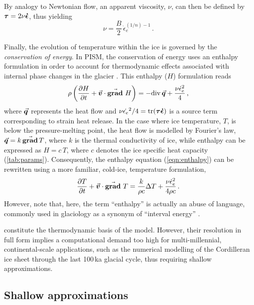\documentclass[a4paper]{kappa}
\newcommand{\vect}[1]{\va*{#1}} %
\newcommand{\tens}[1]{\vb*{#1}} %
\renewcommand{\div}[1]{\mathrm{div}\,#1}            %
\renewcommand{\grad}[1]{\vect{\mathrm{grad}}\,#1}   %
\newcommand{\matdv}[1]{\pdv{#1}{t}+\vect{v}\cdot\grad{}\,#1}  %
\newcommand{\doteps}[0]{\dot{\epsilon}} %
\newcommand{\DST}[0]{\tens{\tau}}       %
\newcommand{\SRT}[0]{\tens{\doteps}}    %
\begin{document}
By analogy to Newtonian flow, an apparent viscosity, $\nu$, can then be defined
by ${\DST = 2 \nu\SRT}$, thus yielding
\begin{equation}
    \label{eqn:viscosity}
    \nu = \frac{B}{2}\,\doteps_e^{(1/n)-1} \,.
\end{equation}

Finally, the evolution of temperature within the ice is governed by the
\emph{conservation of energy}. In PISM, the conservation of energy uses an
enthalpy formulation in order to
account for thermodynamic effects associated with internal phase changes in the
glacier \citep[Eqs.~20--21]{Aschwanden.etal.2012}. This enthalpy ($H$)
formulation reads
\begin{equation}
    \label{eqn:enthalpy}
    \rho \left(\matdv{H}\right)
        = -\div{\vect{q}} + \frac{\nu\doteps_e^2}{4} \,,
\end{equation}
where $\vect{q}$ represents the heat flow and
${\nu\dot{\epsilon_e}^2/4 = \tr(\DST\SRT)}$ is a
source term corresponding to strain heat release. In the case where ice
temperature, $T$, is below the pressure-melting point, the heat flow is
modelled by Fourier's law, $\vect{q} = k\,\grad{T}$, where $k$ is the thermal
conductivity of ice, while enthalpy can be expressed as $H=c\,T$, where $c$
denotes the ice specific heat capacity (\cref{tab:params}).
Consequently, the enthalpy equation (\ref{eqn:enthalpy}) can be rewritten using
a more familiar, cold-ice, temperature formulation,
\begin{equation}
    \label{eqn:temperature}
    \matdv{T} = \frac{k}{\rho c} \Delta T
                + \frac{\nu\doteps_e^2}{4\rho c} \,.
\end{equation}
However, note that, here, the term ``enthalpy'' is actually an abuse of
language, commonly used in glaciology as a synonym of ``interval energy''
\citep{Aschwanden.etal.2012}.

constitute the thermodynamic basis
of the model. However, their resolution in full form implies a computational
demand too high for multi-millennial, continental-scale applications, such as
the numerical modelling of the Cordilleran ice sheet through the last 100\,ka
glacial cycle, thus requiring shallow approximations.


\subsection{Shallow approximations}
\label{sec:siassa}
\end{document}
